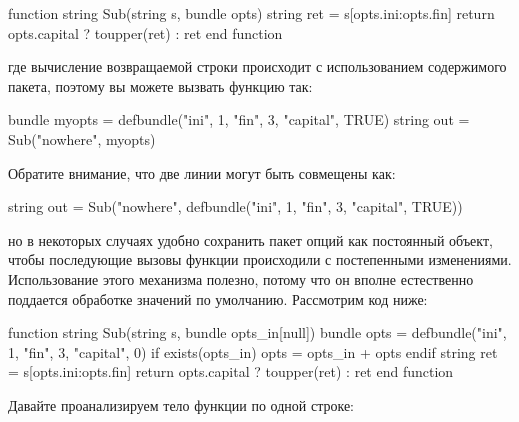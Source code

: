 \begin{code}
function string Sub(string s, bundle opts)
    string ret = s[opts.ini:opts.fin]
    return opts.capital ? toupper(ret) : ret
end function
\end{code}
где вычисление возвращаемой строки происходит с использованием
содержимого пакета, поэтому вы можете вызвать функцию так:
\begin{code}
  bundle myopts = defbundle("ini", 1, "fin", 3, "capital", TRUE)
  string out = Sub("nowhere", myopts)
\end{code}
Обратите внимание, что две линии могут быть совмещены как: 
\begin{code}
  string out = Sub("nowhere", defbundle("ini", 1, "fin", 3,
                                        "capital", TRUE))
\end{code}
но в некоторых случаях удобно сохранить пакет опций как постоянный
объект, чтобы последующие вызовы функции происходили с постепенными
изменениями.  Использование этого механизма полезно, потому что он
вполне естественно поддается обработке значений по
умолчанию. Рассмотрим код ниже:
\begin{code}
function string Sub(string s, bundle opts_in[null])
    bundle opts = defbundle("ini", 1, "fin", 3, "capital", 0)
    if exists(opts_in)
        opts = opts_in + opts
    endif
    string ret = s[opts.ini:opts.fin]
    return opts.capital ? toupper(ret) : ret
end function
\end{code}
Давайте проанализируем тело функции по одной строке:

